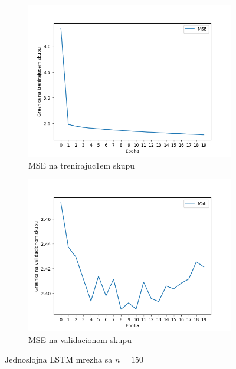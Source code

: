 \documentclass[a4paper, openany, oneside, 11pt]{book}
\begin{document}
\begin{figure}[!h]
        \centering
        \begin{subfigure}{0.475\textwidth}
            \centering
            \includegraphics[scale=0.45]{res/SingleLayerLSTM_150units_train.png}
            \caption{\acrshort{MSE} na trenirajuc1em skupu}
            \label{fig:4_5a}
            \vspace{0pt}
        \end{subfigure}%
        \begin{subfigure}{0.475\textwidth}
            \centering
            \includegraphics[scale=0.45]{res/SingleLayerLSTM_150units_validation.png}
            \caption{\acrshort{MSE} na validacionom skupu}
            \label{fig:4_5b}
            \vspace{0pt}
        \end{subfigure}
        \caption{Jednoslojna \acrshort{LSTM} mrezha sa $n=150$}
        \label{fig:4_5}
\end{figure}
\end{document}
